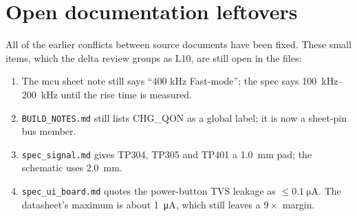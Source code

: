 \section{Open documentation leftovers}\label{sec:inconsistencies}

All of the earlier conflicts between source documents have been fixed. These small items, which the delta review groups as L10, are still open in the files:
\begin{enumerate}[itemsep=1pt]
  \item The mcu sheet note still says ``400 kHz Fast-mode''; the spec says \qtyrange{100}{200}{\kilo\hertz} until the rise time is measured.
  \item \texttt{BUILD\_NOTES.md} still lists CHG\_QON as a global label; it is now a sheet-pin bus member.
  \item \texttt{spec\_signal.md} gives TP304, TP305 and TP401 a \qty{1.0}{\milli\metre} pad; the schematic uses \qty{2.0}{\milli\metre}.
  \item \texttt{spec\_ui\_board.md} quotes the power-button TVS leakage as $\le\qty{0.1}{\micro\ampere}$. The datasheet's maximum is about \qty{1}{\micro\ampere}, which still leaves a $9\times$ margin.
\end{enumerate}
